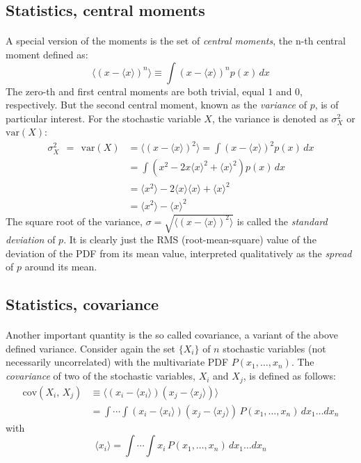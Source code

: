 \documentclass[%
oneside,                 %
final,                   %
10pt]{article}
\begin{document}
\subsection{Statistics, central moments}

\paragraph{}
A special version of the moments is the set of \emph{central moments},
the n-th central moment defined as:
\[
\langle (x-\langle x \rangle )^n\rangle \equiv \int\! (x-\langle x\rangle)^n p(x)\,dx
\]
The zero-th and first central moments are both trivial, equal $1$ and
$0$, respectively. But the second central moment, known as the
\emph{variance} of $p$, is of particular interest. For the stochastic
variable $X$, the variance is denoted as $\sigma^2_X$ or $\mathrm{var}(X)$:
\begin{align}
\sigma^2_X\ \ =\ \ \mathrm{var}(X) & =  \langle (x-\langle x\rangle)^2\rangle =
\int\! (x-\langle x\rangle)^2 p(x)\,dx\\
& =  \int\! \left(x^2 - 2 x \langle x\rangle^{2} +
  \langle x\rangle^2\right)p(x)\,dx\\
& =  \langle x^2\rangle - 2 \langle x\rangle\langle x\rangle + \langle x\rangle^2\\
& =  \langle x^2\rangle - \langle x\rangle^2
\end{align}
The square root of the variance, $\sigma =\sqrt{\langle (x-\langle x\rangle)^2\rangle}$ is called the \emph{standard deviation} of $p$. It is clearly just the RMS (root-mean-square)
value of the deviation of the PDF from its mean value, interpreted
qualitatively as the \emph{spread} of $p$ around its mean.



\subsection{Statistics, covariance}

\paragraph{}
Another important quantity is the so called covariance, a variant of
the above defined variance. Consider again the set $\{X_i\}$ of $n$
stochastic variables (not necessarily uncorrelated) with the
multivariate PDF $P(x_1,\dots,x_n)$. The \emph{covariance} of two
of the stochastic variables, $X_i$ and $X_j$, is defined as follows:
\begin{align}
\mathrm{cov}(X_i,\,X_j) &\equiv \langle (x_i-\langle x_i\rangle)(x_j-\langle x_j\rangle)\rangle
\nonumber\\
&=
\int\!\cdots\!\int\!(x_i-\langle x_i \rangle)(x_j-\langle x_j \rangle)\,
P(x_1,\dots,x_n)\,dx_1\dots dx_n
\label{eq:def_covariance}
\end{align}
with
\[
\langle x_i\rangle =
\int\!\cdots\!\int\!x_i\,P(x_1,\dots,x_n)\,dx_1\dots dx_n
\]
\end{document}
